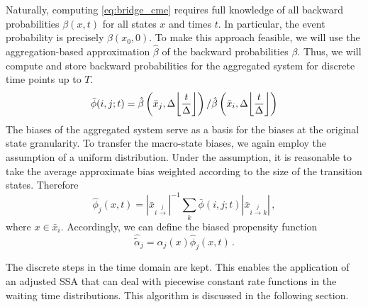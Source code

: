 Naturally, computing \eqref{eq:bridge_cme} requires full knowledge of
all backward probabilities $\beta(x, t)$ for all states $x$ and times $t$.
In particular, the event probability is precisely $\beta(x_0, 0)$.
To make this approach feasible, we will use the aggregation-based
approximation $\hat{\beta}$ of the backward probabilities $\beta$.
Thus, we will compute and store backward probabilities for the
aggregated system for discrete time points up to $T$.
\[
  \bar{\phi}(i, j; t) = \hat{\beta}\left(\bar{x}_j,
  \Delta\floor*{\frac{t}{\Delta}}\right) /
  \hat{\beta}\left(\bar{x}_i, \Delta\floor*{\frac{t}{\Delta}}\right)
\]
The biases of the aggregated system serve as a basis for the biases
at the original state granularity.
To transfer the macro-state biases, we again employ the assumption of
a uniform distribution.
Under the assumption, it is reasonable to take the average
approximate bias weighted according to the size of the transition states.
Therefore
\[
  \hat{\phi}_j(x, t)
  =
  {\left|\bar{x}_{i\xrightarrow{j}}\right|}^{-1}
  \sum_k
  \bar\phi(i, j; t)
  \left|\bar{x}_{i\xrightarrow{j}k}\right|\,,
\]
where $x\in\bar{x}_i$.
Accordingly, we can define the biased propensity function
\[
  \hat{\tilde{\alpha}}_j
  =
  \alpha_j(x)\hat{\phi}_j(x, t)\,.
\]

The discrete steps in the time domain are kept.
This enables the application of an adjusted \ac{SSA} that can deal
with piecewise constant rate functions in the waiting time distributions.
This algorithm is discussed in the following section.

